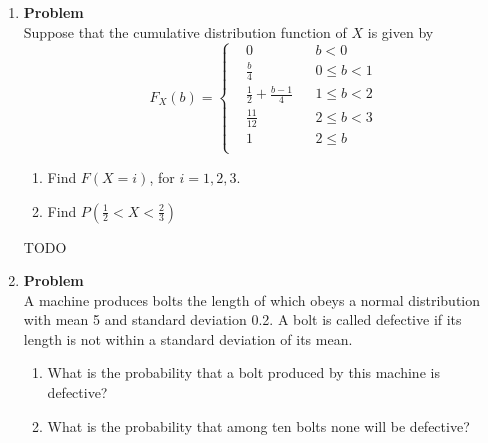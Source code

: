 \documentclass[12pt]{article}
\newenvironment{Ex}{\textbf{Problem}\vspace{.75em}\\}{}
\newcommand{\dd}[1]{\:\mathrm{d}{#1}}
\begin{document}
\begin{enumerate}
\begin{Ex}
\begin{solution}
\begin{enumerate}
\begin{equation}
\begin{aligned}
            \int_{-2}^{1}\frac{1}{2\sqrt{2\pi}}e^{-\frac{(y-1)^2}{8}}\dd{y} \\
            \implies P(-2 \le Y \le 1) &= 0.4332 \\
          \end{aligned}
        \end{equation}
      \item $P(|Y|^2 < 1.5)$ is {\huge TODO}.
      \end{enumerate}
    \end{solution}
  \end{Ex}
\item
  \begin{Ex}
    Suppose that the cumulative distribution function of $X$ is given
    by
    \begin{equation}
      \label{eq:2-question}
      F_X(b) = \left\{
        \begin{aligned}
          & 0 && b<0 \\
          & \frac{b}{4} && 0 \le b < 1 \\
          & \frac{1}{2} + \frac{b-1}{4}  && 1 \le b < 2 \\
          & \frac{11}{12} && 2 \le b < 3 \\
          & 1 && 2 \le b \\
        \end{aligned} \right.
    \end{equation}
    \begin{enumerate}
    \item Find $F(X=i)$, for $i=1,2,3$.
    \item Find $P\left(\frac{1}{2} < X < \frac{2}{3}\right)$
    \end{enumerate}
    \begin{solution} \hfill
      {\huge TODO}
    \end{solution}
  \end{Ex}
\item 
  \begin{Ex}
    A machine produces bolts the length of which obeys a normal
    distribution with mean 5 and standard deviation 0.2. A bolt is
    called defective if its length is not within a standard deviation
    of its mean.
    \begin{enumerate}
    \item What is the probability that a bolt produced by this machine
      is defective?
    \item What is the probability that among ten bolts none will be
      defective?

\end{enumerate}
\end{Ex}
\end{enumerate}
\end{document}

